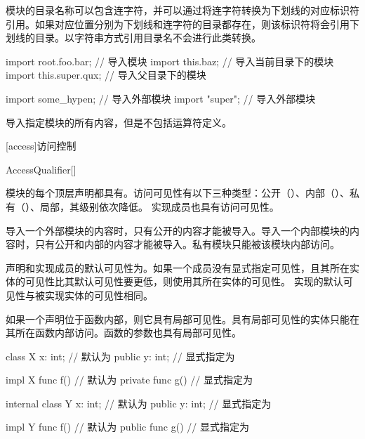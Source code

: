 \pnum
模块的目录名称可以包含连字符，并可以通过将连字符转换为下划线的对应标识符引用。如果对应位置分别为下划线和连字符的目录都存在，则该标识符将会引用下划线的目录。以字符串方式引用目录名不会进行此类转换。

\enterexample
\begin{codeblock}
import root.foo.bar; // 导入模块
import this.baz; // 导入当前目录下的模块
import this.super.qux; // 导入父目录下的模块

import some_hypen; // 导入外部模块
import "super"; // 导入外部模块
\end{codeblock}
\exitexample

\pnum
\tcode{*}导入指定模块的所有内容，但是不包括运算符定义。

[access]{访问控制}

\begin{bnf}{AccessQualifier}[\oneof]
\end{bnf}

\pnum
模块的每个顶层声明都具有。访问可见性有以下三种类型：公开（）、内部（）、私有（）、局部，其级别依次降低。
实现成员也具有访问可见性。

\pnum
导入一个外部模块的内容时，只有公开的内容才能被导入。导入一个内部模块的内容时，只有公开和内部的内容才能被导入。私有模块只能被该模块内部访问。

\pnum
声明和实现成员的默认可见性为。如果一个成员没有显式指定可见性，且其所在实体的可见性比其默认可见性要更低，则使用其所在实体的可见性。
实现的默认可见性与被实现实体的可见性相同。

\pnum
如果一个声明位于函数内部，则它具有局部可见性。具有局部可见性的实体只能在其所在函数内部访问。函数的参数也具有局部可见性。

\enterexample
\begin{codeblock}
class X {
    x: int; // 默认为
    public y: int; // 显式指定为
}

impl X {
    func f() {} // 默认为
    private func g() {} // 显式指定为
}

internal class Y {
    x: int; // 默认为
    public y: int; // 显式指定为
}

impl Y {
    func f() {} // 默认为
    public func g() {} // 显式指定为
}
\end{codeblock}